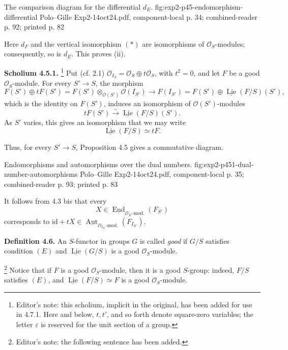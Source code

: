   {The comparison diagram for the differential \(d_E\).}
  {fig:exp2-p45-endomorphism-differential}
  {Polo--Gille Exp2-14oct24.pdf, component-local p. 34; combined-reader p. 92; printed p. 82}

Here \(d_F\) and the vertical isomorphism \((*)\) are isomorphisms of
\(\mathcal O_S\)-modules; consequently, so is \(d_E\). This proves (ii).

\medskip
\noindent\textbf{Scholium 4.5.1.}
\footnote{Editor's note: this scholium, implicit in the original, has been
added for use in 4.7.1. Here and below, \(t,t'\), and so forth denote
square-zero variables; the letter \(\varepsilon\) is reserved for the unit
section of a group.}
Put (cf. 2.1)
\(\mathcal O_{I_S}=\mathcal O_S\oplus t\mathcal O_S\), with \(t^2=0\),
and let \(F\) be a good \(\mathcal O_S\)-module. For every \(S'\to S\),
the morphism
\[
 F(S')\oplus tF(S')
 =F(S')\otimes_{\mathcal O(S')}\mathcal O(I_{S'})
 \longrightarrow
 F(I_{S'})
 =F(S')\oplus\underline{\operatorname{Lie}}(F/S)(S'),
\]
which is the identity on \(F(S')\), induces an isomorphism of
\(\mathcal O(S')\)-modules
\[
 tF(S')\xrightarrow{\sim}\underline{\operatorname{Lie}}(F/S)(S').
\]
As \(S'\) varies, this gives an isomorphism that we may write
\[
 \underline{\operatorname{Lie}}(F/S)\simeq tF.
\]

Thus, for every \(S'\to S\), Proposition 4.5 gives a commutative
diagram.

  {Endomorphisms and automorphisms over the dual numbers.}
  {fig:exp2-p451-dual-number-automorphisms}
  {Polo--Gille Exp2-14oct24.pdf, component-local p. 35; combined-reader p. 93; printed p. 83}

It follows from 4.3 bis that every
\[
 X\in
 \underline{\operatorname{End}}_{\mathcal O_{S'}\text{-mod.}}(F_{S'})
\]
corresponds to
\(\mathrm{id}+tX\in
\underline{\operatorname{Aut}}_{\mathcal O_{I_{S'}}\text{-mod.}}
(F_{I_{S'}})\).

\medskip
\noindent\textbf{Definition 4.6.}
An \(S\)-functor in groups \(G\) is called \emph{good} if \(G/S\)
satisfies condition \((E)\) and
\(\underline{\operatorname{Lie}}(G/S)\) is a good
\(\mathcal O_S\)-module.

\footnote{Editor's note: the following sentence has been added.}
Notice that if \(F\) is a good \(\mathcal O_S\)-module, then it is a
good \(S\)-group: indeed, \(F/S\) satisfies \((E)\), and
\(\underline{\operatorname{Lie}}(F/S)\simeq F\) is a good
\(\mathcal O_S\)-module.


